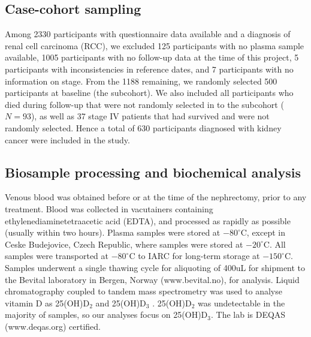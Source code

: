 \documentclass[a4paper,11pt]{article}
\renewcommand{\cite}{\citep}
\begin{document}
\subsection*{Case-cohort sampling}
Among 2330 participants with questionnaire data available and a diagnosis of 
renal cell carcinoma (RCC), we excluded 125 participants 
with no plasma sample available, 1005 participants with no follow-up data at 
the time of this project, 5 participants with inconsistencies in reference 
dates, and 7 participants with no information on stage. From the 1188 
remaining, we randomly selected 500 participants at baseline (the subcohort). 
We also included all participants who died during follow-up that were not 
randomly selected in to the subcohort ($N=93$), as well as 37 stage IV patients 
that had survived and were not randomly selected. Hence a total of 
630 participants diagnosed with kidney cancer were included in the study.

\subsection*{Biosample processing and biochemical analysis}
Venous blood was obtained before or at the time of the nephrectomy, prior to 
any treatment. Blood was collected in vacutainers containing 
ethylenediaminetetraacetic acid (EDTA), and processed as rapidly as possible 
(usually within two hours). Plasma samples were stored at $-80^{\circ}$C, 
except in Ceske Budejovice, Czech Republic, where samples were stored at 
$-20^{\circ}$C. All samples were transported at $-80^{\circ}$C to IARC for 
long-term storage at $-150^{\circ}$C. Samples underwent a single thawing cycle 
for aliquoting of 400uL for shipment to the Bevital laboratory in Bergen, 
Norway (www.bevital.no), for analysis. Liquid chromatography coupled to tandem 
mass spectrometry was used to analyse vitamin D as 25(OH)D$_2$ and 
25(OH)D$_3$ \cite{midttun_determination_2011}. 25(OH)D$_2$ was undetectable in 
the majority of samples, so our analyses focus on 25(OH)D$_3$. The lab is DEQAS 
(www.deqas.org) certified.
\end{document}
